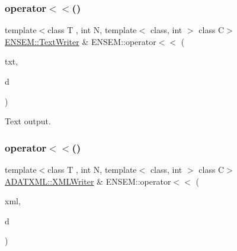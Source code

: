 \subsubsection{\texorpdfstring{operator$<$$<$()}{operator<<()}\hspace{0.1cm}{\footnotesize\ttfamily [1/2]}}
{\footnotesize\ttfamily template$<$class T , int N, template$<$ class, int $>$ class C$>$ \\
\mbox{\hyperlink{classENSEM_1_1TextWriter}{E\+N\+S\+E\+M\+::\+Text\+Writer}} \& E\+N\+S\+E\+M\+::operator$<$$<$ (\begin{DoxyParamCaption}\item[{\mbox{\hyperlink{classENSEM_1_1TextWriter}{E\+N\+S\+E\+M\+::\+Text\+Writer}} \&}]{txt,  }\item[{const \mbox{\hyperlink{classENSEM_1_1PMatrix}{P\+Matrix}}$<$ T, \mbox{\hyperlink{operator__name__util_8cc_a7722c8ecbb62d99aee7ce68b1752f337}{N}}, C $>$ \&}]{d }\end{DoxyParamCaption})\hspace{0.3cm}{\ttfamily [inline]}}



Text output. 

\mbox{\label{group__primmatrix_ga88162a3095bbb5b40ba8100093befe2b}} 
\subsubsection{\texorpdfstring{operator$<$$<$()}{operator<<()}\hspace{0.1cm}{\footnotesize\ttfamily [2/2]}}
{\footnotesize\ttfamily template$<$class T , int N, template$<$ class, int $>$ class C$>$ \\
\mbox{\hyperlink{classADATXML_1_1XMLWriter}{A\+D\+A\+T\+X\+M\+L\+::\+X\+M\+L\+Writer}} \& E\+N\+S\+E\+M\+::operator$<$$<$ (\begin{DoxyParamCaption}\item[{\mbox{\hyperlink{classADATXML_1_1XMLWriter}{A\+D\+A\+T\+X\+M\+L\+::\+X\+M\+L\+Writer}} \&}]{xml,  }\item[{const \mbox{\hyperlink{classENSEM_1_1PMatrix}{P\+Matrix}}$<$ T, \mbox{\hyperlink{operator__name__util_8cc_a7722c8ecbb62d99aee7ce68b1752f337}{N}}, C $>$ \&}]{d }\end{DoxyParamCaption})\hspace{0.3cm}{\ttfamily [inline]}}



